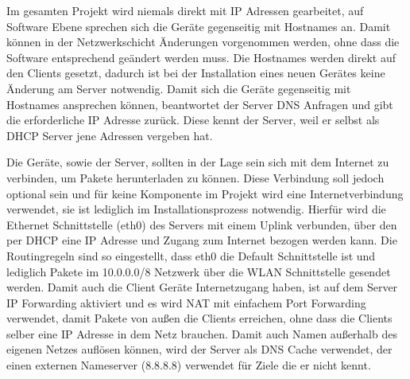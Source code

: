 Im gesamten Projekt wird niemals direkt mit IP Adressen gearbeitet, auf
Software Ebene sprechen sich die Geräte gegenseitig mit Hostnames an. Damit
können in der Netzwerkschicht Änderungen vorgenommen werden, ohne dass die
Software entsprechend geändert werden muss. Die Hostnames werden direkt auf
den Clients gesetzt, dadurch ist bei der Installation eines neuen Gerätes keine
Änderung am Server notwendig. Damit sich die Geräte gegenseitig mit Hostnames
ansprechen können, beantwortet der Server DNS Anfragen und gibt die
erforderliche IP Adresse zurück. Diese kennt der Server, weil er selbst als
DHCP Server jene Adressen vergeben hat.

Die Geräte, sowie der Server, sollten in der Lage sein sich mit dem Internet
zu verbinden, um Pakete herunterladen zu können. Diese Verbindung soll jedoch
optional sein und für keine Komponente im Projekt wird eine Internetverbindung
verwendet, sie ist lediglich im Installationsprozess notwendig. Hierfür wird
die Ethernet Schnittstelle (eth0) des Servers mit einem Uplink verbunden, über
den per DHCP eine IP Adresse und Zugang zum Internet bezogen werden kann. Die
Routingregeln sind so eingestellt, dass eth0 die Default Schnittstelle ist und
lediglich Pakete im 10.0.0.0/8 Netzwerk über die WLAN Schnittstelle gesendet
werden. Damit auch die Client Geräte Internetzugang haben, ist auf dem Server
IP Forwarding aktiviert und es wird NAT mit einfachem Port Forwarding verwendet,
damit Pakete von außen die Clients erreichen, ohne dass die Clients selber eine
IP Adresse in dem Netz brauchen. Damit auch Namen außerhalb des eigenen Netzes
auflösen können, wird der Server als DNS Cache verwendet, der einen externen
Nameserver (8.8.8.8) verwendet für Ziele die er nicht kennt.
